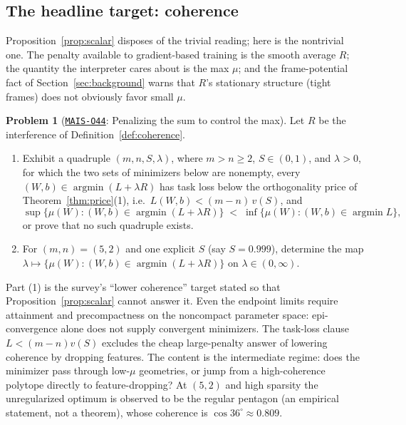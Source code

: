 \documentclass[11pt]{amsart}
\newcommand{\Oid}[1]{\href{https://github.com/lionellevine/MAIS/blob/main/open-problems/MAIS-O#1.md}{\texttt{MAIS-O#1}}}
\theoremstyle{plain}
\theoremstyle{definition}
\newtheorem{problem}[theorem]{Problem}
\begin{document}
\subsection{The headline target: coherence}

Proposition~\ref{prop:scalar} disposes of the trivial reading; here is the nontrivial one. The penalty available to gradient-based training is the smooth average $R$; the quantity the interpreter cares about is the max $\mu$; and the frame-potential fact of Section~\ref{sec:background} warns that $R$'s stationary structure (tight frames) does not obviously favor small $\mu$.

\begin{problem}[\Oid{44}: Penalizing the sum to control the max]\label{prob:summax}
Let $R$ be the interference of Definition~\ref{def:coherence}.
\begin{enumerate}
\item Exhibit a quadruple $(m,n,S,\lambda)$, where $m>n\ge2$, $S\in(0,1)$, and $\lambda>0$, for which the two sets of minimizers below are nonempty, every $(W,b)\in\operatorname{argmin}(L+\lambda R)$ has task loss below the orthogonality price of Theorem~\ref{thm:price}(1), i.e.\ $L(W,b)<(m-n)\,v(S)$, and
\[
\sup\bigl\{\mu(W) : (W,b)\in\operatorname{argmin}(L+\lambda R)\bigr\}
\;<\;
\inf\bigl\{\mu(W) : (W,b)\in\operatorname{argmin} L\bigr\} ,
\]
or prove that no such quadruple exists.
\item For $(m,n)=(5,2)$ and one explicit $S$ (say $S=0.999$), determine the map
$\lambda \mapsto \{\mu(W) : (W,b)\in\operatorname{argmin}(L+\lambda R)\}$ on $\lambda\in(0,\infty)$.
\end{enumerate}
\end{problem}

Part (1) is the survey's ``lower coherence'' target stated so that Proposition~\ref{prop:scalar} cannot answer it. Even the endpoint limits require attainment and precompactness on the noncompact parameter space: epi-convergence alone does not supply convergent minimizers. The task-loss clause $L<(m-n)v(S)$ excludes the cheap large-penalty answer of lowering coherence by dropping features. The content is the intermediate regime: does the minimizer pass through low-$\mu$ geometries, or jump from a high-coherence polytope directly to feature-dropping? At $(5,2)$ and high sparsity the unregularized optimum is observed to be the regular pentagon \cite{elhage2022} (an empirical statement, not a theorem), whose coherence is $\cos 36^\circ\approx0.809$.
\end{document}
